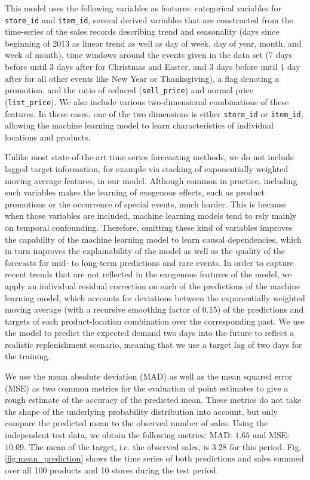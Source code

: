 \documentclass[BCOR=1mm, DIV=calc,10pt,
twoside=true,
twocolumn,
headings=normal]{scrartcl}
\newcommand{\fig}{Fig.}
\begin{document}
\noindent
This model uses the following variables as features: categorical variables for \texttt{store\_id} and \texttt{item\_id}, several derived variables that are constructed from the time-series of the sales records describing trend and seasonality (days since beginning of 2013 as linear trend as well as day of week, day of year, month, and week of month), time windows around the events given in the data set (7 days before until 3 days after for Christmas and Easter, and 3 days before until 1 day after for all other events like New Year or Thanksgiving), a flag denoting a promotion, and the ratio of reduced (\texttt{sell\_price}) and normal price (\texttt{list\_price}). We also include various two-dimensional combinations of these features. In these cases, one of the two dimensions is either \texttt{store\_id} or \texttt{item\_id}, allowing the machine learning model to learn characteristics of individual locations and products.

Unlike most state-of-the-art time series forecasting methods, we do not include lagged target information, for example via stacking of exponentially weighted moving average features, in our model. Although common in practice, including such variables makes the learning of exogenous effects, such as product promotions or the occurrence of special events, much harder. This is because when those variables are included, machine learning models tend to rely mainly on temporal confounding. Therefore, omitting these kind of variables improves the capability of the machine learning model to learn causal dependencies, which in turn improves the explainability of the model as well as the quality of the forecasts for mid- to long-term predictions and rare events. In order to capture recent trends that are not reflected in the exogenous features of the model, we apply an individual residual correction on each of the predictions of the machine learning model, which accounts for deviations between the exponentially weighted moving average (with a recursive smoothing factor of $0.15$) of the predictions and targets of each product-location combination over the corresponding past. We use the model to predict the expected demand two days into the future to reflect a realistic replenishment scenario, meaning that we use a target lag of two days for the training.

\noindent
We use the mean absolute deviation (MAD) as well as the mean squared error (MSE) as two common metrics for the evaluation of point estimates to give a rough estimate of the accuracy of the predicted mean. These metrics do not take the shape of the underlying probability distribution into account, but only compare the predicted mean to the observed number of sales. Using the independent test data, we obtain the following metrics: MAD: $1.65$ and MSE: $10.09$. The mean of the target, i.e. the observed sales, is $3.28$ for this period. \fig \ref{fig:mean_prediction} shows the time series of both predictions and sales summed over all 100 products and 10 stores during the test period.
\end{document}
